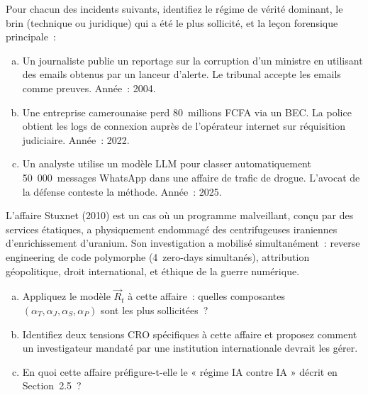 \begin{boxexo}[title={\ding{45}\quad Exercice~2.1 --- Analyse d'un incident par son régime \niveaubase}]
Pour chacun des incidents suivants, identifiez le régime de vérité dominant,
le brin (technique ou juridique) qui a été le plus sollicité, et la leçon
forensique principale~:

\begin{enumerate}[(a)]
    \item Un journaliste publie un reportage sur la corruption d'un ministre
          en utilisant des emails obtenus par un lanceur d'alerte. Le tribunal
          accepte les emails comme preuves. Année~: 2004.
    \item Une entreprise camerounaise perd 80~millions FCFA via un BEC. La
          police obtient les logs de connexion auprès de l'opérateur internet
          sur réquisition judiciaire. Année~: 2022.
    \item Un analyste utilise un modèle LLM pour classer automatiquement
          50~000~messages WhatsApp dans une affaire de trafic de drogue.
          L'avocat de la défense conteste la méthode. Année~: 2025.
\end{enumerate}
\end{boxexo}

\begin{boxexo}[title={\ding{45}\quad Exercice~2.2 --- La double hélice appliquée \niveaumoyen}]
L'affaire Stuxnet (2010) est un cas où un programme malveillant, conçu par
des services étatiques, a physiquement endommagé des centrifugeuses iraniennes
d'enrichissement d'uranium. Son investigation a mobilisé simultanément~:
reverse engineering de code polymorphe (4~zero-days simultanés), attribution
géopolitique, droit international, et éthique de la guerre numérique.

\begin{enumerate}[(a)]
    \item Appliquez le modèle $\vec{R}_t$ à cette affaire~: quelles composantes
          $(\alpha_T, \alpha_J, \alpha_S, \alpha_P)$ sont les plus sollicitées~?
    \item Identifiez deux tensions CRO spécifiques à cette affaire et proposez
          comment un investigateur mandaté par une institution internationale
          devrait les gérer.
    \item En quoi cette affaire préfigure-t-elle le « régime IA contre IA »
          décrit en Section~2.5~?
\end{enumerate}
\end{boxexo}

